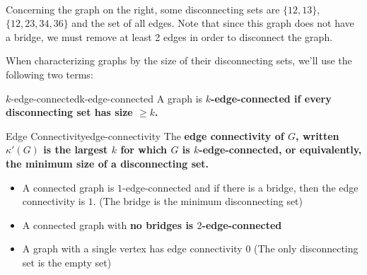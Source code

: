 \newpage
\begin{example}\label{exmp:connectivity-introduction-disconnecting-set}
    \ \\
    \begin{minipage}{.78\textwidth}
        Concerning the graph on the right, some disconnecting sets are $\{12, 13\}$, $\{12, 23, 34, 36\}$ and the set of all edges. Note that since this graph does not have a bridge, we must remove at least 2 edges in order to disconnect the graph.
    \end{minipage}\hfill
    \begin{minipage}{.19\textwidth}
        \centering
    \end{minipage}
\end{example}

When characterizing graphs by the size of their disconnecting sets, we'll use the following two terms:
\begin{definition}{$k$-edge-connected}{k-edge-connected}
    A graph is \bf{$k$-edge-connected} if every disconnecting set has size $\geq k$.
\end{definition}
\begin{definition}{Edge Connectivity}{edge-connectivity}
    The \bf{edge connectivity} of $G$, written $\kappa'(G)$ is the largest $k$ for which $G$ is $k$-edge-connected, or equivalently, the minimum size of a disconnecting set.
\end{definition}

\begin{example}
    \leavevmode
    \begin{itemize}
        \item A connected graph is $1$-edge-connected and if there is a bridge, then the edge connectivity is $1$. (The bridge is the minimum disconnecting set)
        \item A connected graph with \bf{no} bridges is $2$-edge-connected
        \item A graph with a single vertex has edge connectivity $0$ (The only disconnecting set is the empty set)
    \end{itemize}
\end{example}

